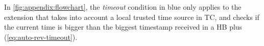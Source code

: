 In \cref{fig:appendix:flowchart}, the \emph{timeout} condition in blue only
applies to the extension that takes into account a local trusted time source in
\ac{TC}, and checks if the current time is bigger than the biggest timestamp
received in a \ac{HB} plus \paramtt{} (\cref{eq:auto-rev-timeout}).